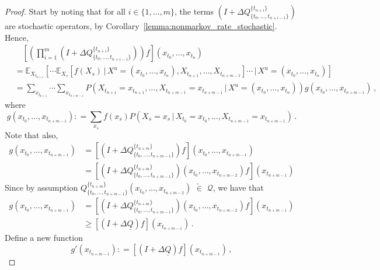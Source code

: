 \documentclass[10pt]{paper}
\newcommand{\lrate}{\underline{Q}}
\newcommand{\coloneqq}{:\!=}
\newcommand{\opinset}{\,\,\widetilde{\in}\,\,}
\begin{document}
\begin{proof}
Start by noting that for all $i\in\{1,\ldots,m\}$, the terms $\left(I + \Delta Q_{\{t_0,\ldots,t_{n+i-1}\}}^{\{t_{n+i}\}}\right)$ are stochastic operators, by Corollary~\ref{lemma:nonmarkov_rate_stochastic}. Hence,
\begin{align*}
&\quad \left[\left(\prod_{i=1}^m \left(I + \Delta Q_{\{t_0,\ldots,t_{n+i-1}\}}^{\{t_{n+i}\}} \right)\right)f\right](x_{t_0},\ldots,x_{t_n}) \\
&= \mathbb{E}_{X_{t_{n+1}}}\left[\cdots\mathbb{E}_{X_s}\left[f(X_s)\,\vert\,X^u=(x_{t_0},\ldots,x_{t_n}),X_{t_{n+1}},\ldots,X_{t_{n+m-1}}\right]\cdots\,\vert\,X^u=(x_{t_0},\ldots,x_{t_n})\right] \\
&= \sum_{x_{t_{n+1}}}\cdots\sum_{x_{t_{n+m-1}}} P\left(X_{t_{n+1}}=x_{t_{n+1}},\ldots,X_{t_{n+m-1}}=x_{t_{n+m-1}}\,\vert\,X^u=(x_{t_0},\ldots,x_{t_n})\right)g(x_{t_0},\ldots,x_{t_{n+m-1}})\,,
\end{align*}
where
\begin{equation*}
g(x_{t_0},\ldots,x_{t_{n+m-1}}) \coloneqq \sum_{x_s}f(x_s)P\left(X_s=x_s\,\vert\,X_{t_0}=x_{t_0},\ldots,X_{t_{n+m-1}}=x_{t_{n+m-1}}\right)\,.
\end{equation*}
Note that also,
\begin{align*}
g(x_{t_0},\ldots,x_{t_{n+m-1}}) &= \left[\left(I+\Delta Q_{\{t_0,\ldots,t_{n+m-1}\}}^{\{t_{n+m}\}}\right)f\right](x_{t_0},\ldots,x_{t_{n+m-1}}) \\
 &= \left[\left(I+\Delta Q_{\{t_0,\ldots,t_{n+m-1}\}}^{\{t_{n+m}\}}\right)(x_{t_0},\ldots,x_{t_{n+m-2}})f\right](x_{t_{n+m-1}})
\end{align*}
Since by assumption $Q_{\{t_0,\ldots,t_{n+m-1}\}}^{\{t_{n+m}\}}(x_{t_0},\ldots,x_{t_{n+m-2}})\opinset\mathcal{Q}$, we have that
\begin{align*}
g(x_{t_0},\ldots,x_{t_{n+m-1}}) &= \left[\left(I+\Delta Q_{\{t_0,\ldots,t_{n+m-1}\}}^{\{t_{n+m}\}}\right)(x_{t_0},\ldots,x_{t_{n+m-2}})f\right](x_{t_{n+m-1}})\\
 &\geq \left[\left(I + \Delta\lrate\right)f\right](x_{t_{n+m-1}})\,.
\end{align*}
Define a new function
\begin{equation*}
g'(x_{t_{n+m-1}}) \coloneqq \left[\left(I + \Delta\lrate\right)f\right](x_{t_{n+m-1}})\,,

\end{equation*}
\end{proof}
\end{document}
